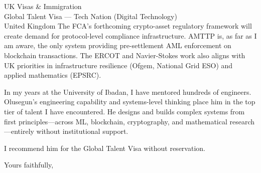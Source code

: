 \documentclass[12pt,a4paper]{letter}
\begin{document}
\begin{letter}{UK Visas \& Immigration\\
Global Talent Visa --- Tech Nation (Digital Technology)\\
United Kingdom}
The FCA's forthcoming crypto-asset regulatory framework will create
demand for protocol-level compliance infrastructure.  AMTTP is, as far
as I am aware, the only system providing pre-settlement AML enforcement
on blockchain transactions.  The ERCOT and Navier-Stokes work also
aligns with UK priorities in infrastructure resilience (Ofgem, National
Grid ESO) and applied mathematics (EPSRC).

In my years at the University of Ibadan, I have mentored hundreds of
engineers.  Olusegun's engineering capability and systems-level thinking
place him in the top tier of talent I have encountered.  He designs and
builds complex systems from first principles---across ML, blockchain,
cryptography, and mathematical research---entirely without institutional
support.

I recommend him for the Global Talent Visa without reservation.

\closing{Yours faithfully,}

\end{letter}
\end{document}
